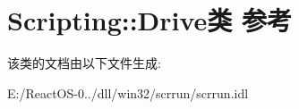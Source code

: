 \hypertarget{class_scripting_1_1_drive}{}\section{Scripting\+:\+:Drive类 参考}
\label{class_scripting_1_1_drive}


该类的文档由以下文件生成\+:\begin{DoxyCompactItemize}
\item 
E\+:/\+React\+O\+S-\/0../dll/win32/scrrun/scrrun.\+idl\end{DoxyCompactItemize}
